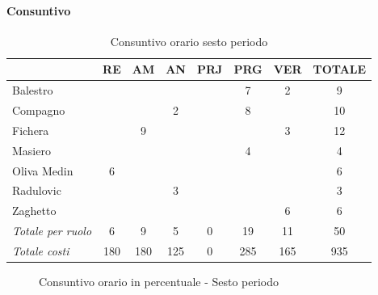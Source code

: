 \documentclass[a4paper,12pt]{article}
\begin{document}
            \paragraph{Consuntivo}
                \begin{table}[H]
                \centering
                \caption{Consuntivo orario sesto periodo}
                \begin{tabular}{|l|c|c|c|c|c|c|c|}
                \hline
                    \rowcolor{lightgray}{\textbf{Membro}} & {\textbf{RE}} & {\textbf{AM}} & {\textbf{AN}} & {\textbf{PRJ}} & {\textbf{PRG}} & {\textbf{VER}} & {\textbf{TOTALE}}\\
                \hline
                    Balestro & & & & & 7 & 2 & 9\\
                \hline
                    Compagno & & & 2 & & 8 & & 10\\
                \hline
                    Fichera & & 9 & & & & 3 & 12\\
                \hline
                    Masiero & & & & & 4 & & 4\\
                \hline
                    Oliva Medin & 6 & & & & & & 6\\
                \hline
                    Radulovic & & & 3 & & & & 3\\
                \hline
                    Zaghetto & & & & & & 6 & 6\\
                \hline
                    \rowcolor{lightgray}\textit{Totale per ruolo} & 6 & 9 & 5 & 0 & 19 & 11 & 50\\
                \hline
                    \rowcolor{lightgray}\textit{Totale costi} & 180 & 180 & 125 & 0 & 285 & 165 & 935\\
                \hline
                \end{tabular}
                \end{table}

                \begin{figure}[H]
                \centering
                \caption{Consuntivo orario in percentuale - Sesto periodo}
                \end{figure}
                
\end{document}
